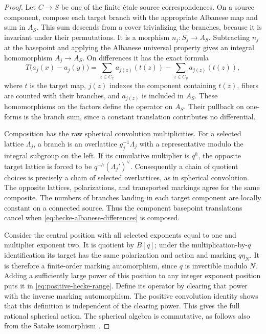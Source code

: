 \begin{proof}
Let \(C\to S\) be one of the finite étale source correspondences.
On a source component, compose each target branch with the
appropriate Albanese map and sum in \(A_S\).  This sum descends
from a cover trivializing the branches, because it is invariant
under their permutations.  It is a morphism \(n_j:S_j\to A_S\).
Subtracting \(n_j\) at the basepoint and applying the Albanese
universal property gives an integral homomorphism
\(A_j\to A_S\).  On differences it has the exact formula
\begin{equation}\label{eq:hecke-albanese-differences}
T\bigl(a_j(x)-a_j(y)\bigr)
 =\sum_{z\in C_x}a_{j(z)}(t(z))
  -\sum_{z\in C_y}a_{j(z)}(t(z)),
\end{equation}
where \(t\) is the target map, \(j(z)\) indexes the component
containing \(t(z)\), fibers are counted with their branches, and
\(a_{j(z)}\) is included in \(A_S\).  These
homomorphisms on the factors define the operator on \(A_S\).
Their pullback on one-forms is the branch sum, since a constant
translation contributes no differential.

Composition has the raw spherical convolution multiplicities.
For a selected lattice \(\Lambda_j\), a branch is an overlattice
\(g_j^{-1}\Lambda_j\) with a representative modulo the integral
subgroup on the left.  If its cumulative multiplier is \(q^h\),
the opposite target lattice is forced to be
\(q^{-h}(\Lambda_j')^\vee\).  Consequently a chain of quotient
choices is precisely a chain of selected overlattices, as in
spherical convolution.  The opposite lattices, polarizations, and
transported markings agree for the same composite.  The numbers
of branches landing in each target component are locally constant
on a connected source.  Thus the component basepoint translations
cancel when \eqref{eq:hecke-albanese-differences} is composed.

Consider the central position with all selected exponents equal to
one and multiplier exponent two.  It is quotient by \(B[q]\);
under the multiplication-by-\(q\) identification its target has
the same polarization and action and marking \(q\eta_N\).  It is
therefore a finite-order marking automorphism, since \(q\) is
invertible modulo \(N\).  Adding a sufficiently large power of
this position to any integer exponent position puts it in
\eqref{eq:positive-hecke-range}.  Define its operator by clearing
that power with the inverse marking automorphism.  The positive
convolution identity shows that this definition is independent
of the clearing power.  This gives the full rational spherical
action.  The spherical algebra is commutative, as follows also
from the Satake isomorphism \cite[\S3]{Gross1998}.
\end{proof}
